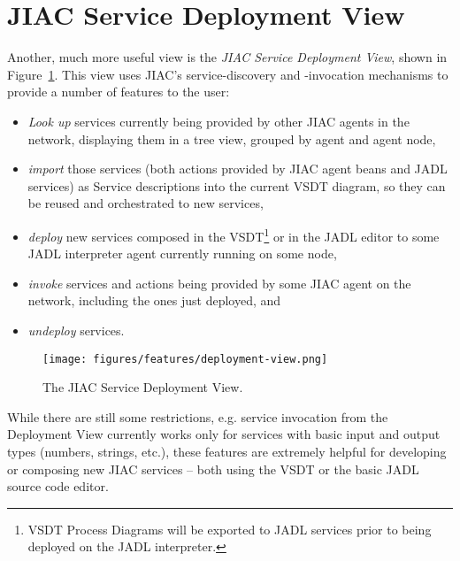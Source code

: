 
\section{JIAC Service Deployment View}

Another, much more useful view is the \emph{JIAC Service Deployment View}, shown
in Figure~\ref{fig:deployView}.  This view uses JIAC's service-discovery and
-invocation mechanisms to provide a number of features to the user:

\begin{itemize}
	\item \emph{Look up} services currently being provided by other JIAC agents in
	the network, displaying them in a tree view, grouped by agent and agent node,

	\item \emph{import} those services (both actions provided by JIAC agent beans
	and JADL services) as Service descriptions into the current VSDT diagram, so
	they can be reused and orchestrated to new services,

	\item \emph{deploy} new services composed in the VSDT\footnote{VSDT Process
	Diagrams will be exported to JADL services prior to being deployed on the
	JADL interpreter.} or in the JADL editor to some JADL interpreter agent
	currently running on some node,

	\item \emph{invoke} services and actions being provided by some JIAC agent on
	the network, including the ones just deployed, and

	\item \emph{undeploy} services.
\end{itemize}

\begin{figure}[ht]
	\centering
	\texttt{[image: figures/features/deployment-view.png]}
	\caption{The JIAC Service Deployment View.}
	\label{fig:deployView}
\end{figure}

While there are still some restrictions, e.g. service invocation from the
Deployment View currently works only for services with basic input and output
types (numbers, strings, etc.), these features are extremely helpful for developing
or composing new JIAC services -- both using the VSDT or the basic JADL source
code editor.

